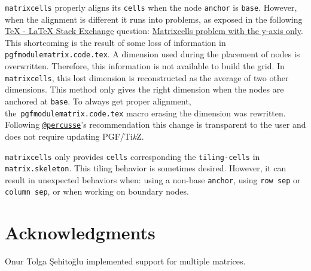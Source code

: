 \documentclass{scrartcl}
\newcommand\code\texttt
\newcommand{\TikZ}{Ti\textit{k}Z\xspace}
\begin{document}
\code{matrixcells} properly aligns its \code{cells} when the node \code{anchor} is \code{base}.
However, when the alignment is different it runs into problems, as exposed in the following \href{http://tex.stackexchange.com}{\TeX{} - \LaTeX{} Stack Exchange} question: \href{http://tex.stackexchange.com/questions/128045/matrixcells-problem-with-the-y-axis-only}{Matrixcells problem with the y-axis only}.
This shortcoming is the result of some loss of information in \code{pgfmodulematrix.code.tex}.
A dimension used during the placement of nodes is overwritten.
Therefore, this information is not available to build the grid.
In \code{matrixcells}, this lost dimension is reconstructed as the average of two other dimensions.
This method only gives the right dimension when the nodes are anchored at \code{base}.
To always get proper alignment, the~\code{pgfmodulematrix.code.tex} macro erasing the dimension was rewritten.
Following \href{http://tex.stackexchange.com/users/3235/percusse}{\code{@percusse}}'s recommendation this change is transparent to the user and does not require updating PGF/\TikZ.

\code{matrixcells} only provides \code{cells} corresponding the \code{tiling-cells} in \code{matrix.skeleton}.
This tiling behavior is sometimes desired.
However, it can result in unexpected behaviors when: using a non-base \code{anchor}, using \code{row sep} or \code{column sep}, or when working on boundary nodes.

\section{Acknowledgments}

Onur Tolga Şehitoğlu implemented support for multiple matrices.
\end{document}
